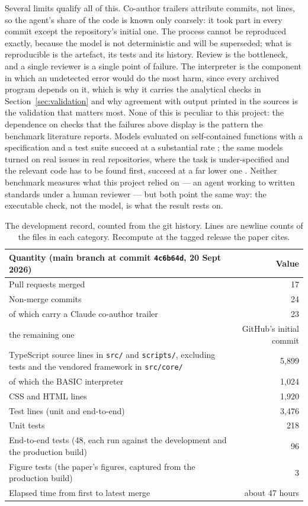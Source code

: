 Several limits qualify all of this. Co-author trailers attribute commits, not lines, so the agent's share of the code is known only coarsely: it took part in every commit except the repository's initial one. The process cannot be reproduced exactly, because the model is not deterministic and will be superseded; what is reproducible is the artefact, its tests and its history. Review is the bottleneck, and a single reviewer is a single point of failure. The interpreter is the component in which an undetected error would do the most harm, since every archived program depends on it, which is why it carries the analytical checks in Section~\ref{sec:validation} and why agreement with output printed in the sources is the validation that matters most. None of this is peculiar to this project: the dependence on checks that the failures above display is the pattern the benchmark literature reports. Models evaluated on self-contained functions with a specification and a test suite succeed at a substantial rate \citep{chen2021}; the same models turned on real issues in real repositories, where the task is under-specified and the relevant code has to be found first, succeed at a far lower one \citep{jimenez2024}. Neither benchmark measures what this project relied on --- an agent working to written standards under a human reviewer --- but both point the same way: the executable check, not the model, is what the result rests on.

\begin{table}[h]
\centering\small
\begin{tabularx}{\linewidth}{@{}Xr@{}}
\toprule
Quantity (main branch at commit \texttt{4c6b64d}, 20 Sept 2026) & Value \\
\midrule
Pull requests merged & 17 \\
Non-merge commits & 24 \\
\quad of which carry a Claude co-author trailer & 23 \\
\quad the remaining one & GitHub's initial commit \\
TypeScript source lines in \texttt{src/} and \texttt{scripts/}, excluding tests and the vendored framework in \texttt{src/core/} & 5{,}899 \\
\quad of which the BASIC interpreter & 1{,}024 \\
CSS and HTML lines & 1{,}920 \\
Test lines (unit and end-to-end) & 3{,}476 \\
Unit tests & 218 \\
End-to-end tests (48, each run against the development and the production build) & 96 \\
Figure tests (the paper's figures, captured from the production build) & 3 \\
Elapsed time from first to latest merge & about 47 hours \\
\bottomrule
\end{tabularx}
\caption{The development record, counted from the git history. Lines are newline counts of the files in each category. Recompute at the tagged release the paper cites.}
\label{tab:llm}
\end{table}


